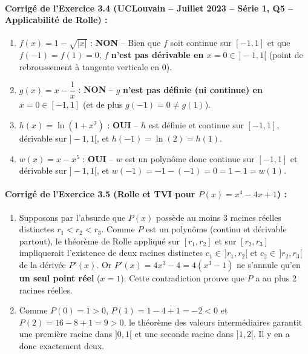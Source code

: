 \paragraph{Corrigé de l'Exercice 3.4 (UCLouvain -- Juillet 2023 -- Série 1, Q5 -- Applicabilité de Rolle) :}
\begin{enumerate}[label=(\alph*)]
    \item $f(x) = 1 - \sqrt{|x|}$ : \textbf{NON} -- Bien que $f$ soit continue sur $[-1, 1]$ et que $f(-1) = f(1) = 0$, $f$ \textbf{n'est pas dérivable en $x = 0 \in \,]-1, 1[$} (point de rebroussement à tangente verticale en $0$).
    \item $g(x) = x - \dfrac{1}{x}$ : \textbf{NON} -- $g$ \textbf{n'est pas définie (ni continue) en $x = 0 \in [-1, 1]$} (et de plus $g(-1) = 0 \neq g(1)$).
    \item $h(x) = \ln(1 + x^2)$ : \textbf{OUI} -- $h$ est définie et continue sur $[-1, 1]$, dérivable sur $]-1, 1[$, et $h(-1) = \ln(2) = h(1)$.
    \item $w(x) = x - x^5$ : \textbf{OUI} -- $w$ est un polynôme donc continue sur $[-1, 1]$ et dérivable sur $]-1, 1[$, et $w(-1) = -1 - (-1) = 0 = 1 - 1 = w(1)$.
\end{enumerate}

\paragraph{Corrigé de l'Exercice 3.5 (Rolle et TVI pour $P(x) = x^4 - 4x + 1$) :}
\begin{enumerate}[label=(\alph*)]
    \item Supposons par l'absurde que $P(x)$ possède au moins $3$ racines réelles distinctes $r_1 < r_2 < r_3$. Comme $P$ est un polynôme (continu et dérivable partout), le théorème de Rolle appliqué sur $[r_1, r_2]$ et sur $[r_2, r_3]$ impliquerait l'existence de deux racines distinctes $c_1 \in \,]r_1, r_2[$ et $c_2 \in \,]r_2, r_3[$ de la dérivée $P'(x)$. Or $P'(x) = 4x^3 - 4 = 4(x^3 - 1)$ ne s'annule qu'en \textbf{un seul point réel} ($x = 1$). Cette contradiction prouve que $P$ a au plus $2$ racines réelles.
    \item Comme $P(0) = 1 > 0$, $P(1) = 1 - 4 + 1 = -2 < 0$ et $P(2) = 16 - 8 + 1 = 9 > 0$, le théorème des valeurs intermédiaires garantit une première racine dans $]0, 1[$ et une seconde racine dans $]1, 2[$. Il y en a donc exactement deux.
\end{enumerate}

